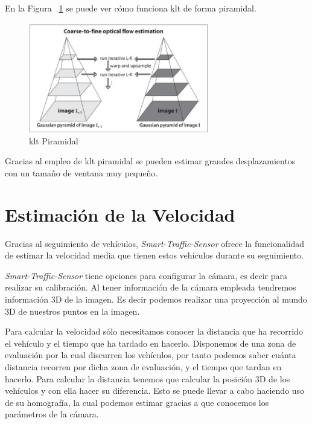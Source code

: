 En la Figura ~\ref{fig.klt_piramidal} se puede ver cómo funciona \acrshort{klt} de forma piramidal.

 \begin{figure}[H] 
\begin{center}
	\includegraphics[width=0.7\textwidth]{figures/Diseno_global/klt_piramidal.png}
   \caption{\acrshort{klt} Piramidal}
	\label{fig.klt_piramidal}
\end{center}
\end{figure}

Gracias al empleo de \acrshort{klt} piramidal se pueden estimar grandes desplazamientos con un tamaño de ventana muy pequeño.


\section{Estimación de la Velocidad}

Gracias al seguimiento de vehículos, \textit{Smart-Traffic-Sensor} ofrece la funcionalidad de estimar la velocidad media que tienen estos vehículos durante su seguimiento.

\textit{Smart-Traffic-Sensor} tiene opciones para configurar la cámara, es decir para realizar su calibración. Al tener información de la cámara empleada tendremos información 3D de la imagen. Es decir podemos realizar una proyección al mundo 3D de nuestros puntos en la imagen.

Para calcular la velocidad sólo necesitamos conocer la distancia que ha recorrido el vehículo y el tiempo que ha tardado en hacerlo. Disponemos de una zona de evaluación por la cual discurren los vehículos, por tanto podemos saber cuánta distancia recorren por dicha zona de evaluación, y el tiempo que tardan en hacerlo. Para calcular la distancia tenemos que calcular la posición 3D de los vehículos y con ella hacer su diferencia. Esto se puede llevar a cabo haciendo uso de su homografía, la cual podemos estimar gracias a que conocemos los parámetros de la cámara.

